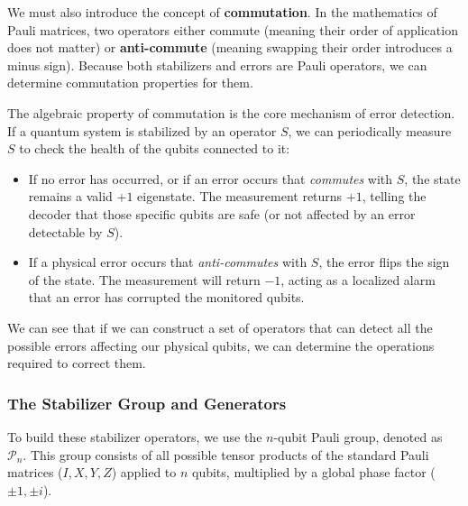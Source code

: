 We must also introduce the concept of \textbf{commutation}. In the mathematics of Pauli matrices, two operators either commute (meaning their order of application does not matter) or \textbf{anti-commute} (meaning swapping their order introduces a minus sign). Because both stabilizers and errors are Pauli operators, we can determine commutation properties for them.

The algebraic property of commutation is the core mechanism of error detection. If a quantum system is stabilized by an operator $S$, we can periodically measure $S$ to check the health of the qubits connected to it:
\begin{itemize}
    \item If no error has occurred, or if an error occurs that \textit{commutes} with $S$, the state remains a valid $+1$ eigenstate. The measurement returns $+1$, telling the decoder that those specific qubits are safe (or not affected by an error detectable by $S$).
    \item If a physical error occurs that \textit{anti-commutes} with $S$, the error flips the sign of the state. The measurement will return $-1$, acting as a localized alarm that an error has corrupted the monitored qubits.
\end{itemize}

We can see that if we can construct a set of operators that can detect all the possible errors affecting our physical qubits, we can determine the operations required to correct them.

\subsubsection{The Stabilizer Group and Generators}
To build these stabilizer operators, we use the $n$-qubit Pauli group, denoted as $\mathcal{P}_n$. This group consists of all possible tensor products of the standard Pauli matrices ($I, X, Y, Z$) applied to $n$ qubits, multiplied by a global phase factor ($\pm 1, \pm i$). 

